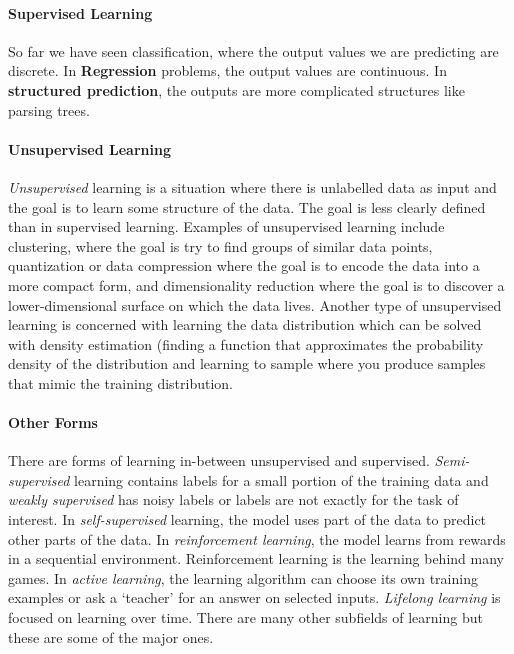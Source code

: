 \paragraph{Supervised Learning}
So far we have seen classification, where the output values we are predicting are discrete. In \textbf{Regression} problems, the output values are continuous. In \textbf{structured prediction}, the outputs are more complicated structures like parsing trees. 
\paragraph{Unsupervised Learning}
\textit{Unsupervised} learning is a situation where there is unlabelled data as input and the goal is to learn some structure of the data. The goal is less clearly defined than in supervised learning. Examples of unsupervised learning include clustering, where the goal is try to find 
groups of similar data points, quantization or data compression where the goal is to encode the data into a more compact form, and dimensionality reduction where the goal is to discover a lower-dimensional surface on which the data lives. Another type of unsupervised learning is concerned with learning the data distribution which can be solved with density estimation (finding a function that approximates the probability density of the distribution and learning to sample where you produce samples that mimic the training distribution. 
\paragraph{Other Forms}
There are forms of learning in-between unsupervised and supervised. \textit{Semi-supervised} learning contains labels for a small portion of the training data and \textit{weakly supervised} has noisy labels or labels are not exactly for the task of interest. In \textit{self-supervised} learning, the model uses part of the data to predict other parts of the data. In \textit{reinforcement learning}, the model learns from rewards in a sequential environment. Reinforcement learning is the learning behind many games. In \textit{active learning}, the learning algorithm can choose its own training examples or ask a `teacher' for an answer on selected inputs.  \textit{Lifelong learning} is focused on learning over time. There are many other subfields of learning but these are some of the major ones. 